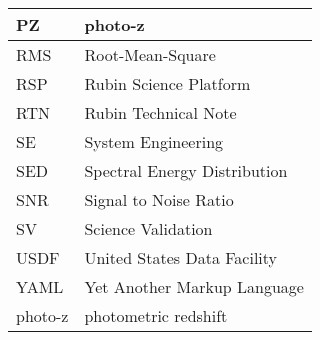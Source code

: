 \begin{longtable}{p{}p{}}
PZ & photo-z \\\hline
RMS & Root-Mean-Square \\\hline
RSP & Rubin Science Platform \\\hline
RTN & Rubin Technical Note \\\hline
SE & System Engineering \\\hline
SED & Spectral Energy Distribution \\\hline
SNR & Signal to Noise Ratio \\\hline
SV & Science Validation \\\hline
USDF & United States Data Facility \\\hline
YAML & Yet Another Markup Language \\\hline
photo-z & photometric redshift \\\hline
\end{longtable}
